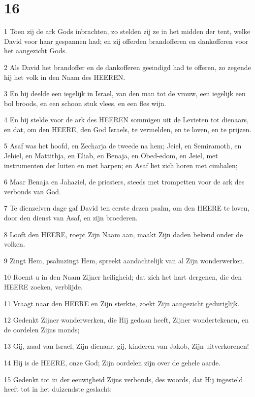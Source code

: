 \chapter{16}

\par 1 Toen zij de ark Gods inbrachten, zo stelden zij ze in het midden der tent, welke David voor haar gespannen had; en zij offerden brandofferen en dankofferen voor het aangezicht Gods.
\par 2 Als David het brandoffer en de dankofferen geeindigd had te offeren, zo zegende hij het volk in den Naam des HEEREN.
\par 3 En hij deelde een iegelijk in Israel, van den man tot de vrouw, een iegelijk een bol broods, en een schoon stuk vlees, en een fles wijn.
\par 4 En hij stelde voor de ark des HEEREN sommigen uit de Levieten tot dienaars, en dat, om den HEERE, den God Israels, te vermelden, en te loven, en te prijzen.
\par 5 Asaf was het hoofd, en Zecharja de tweede na hem; Jeiel, en Semiramoth, en Jehiel, en Mattithja, en Eliab, en Benaja, en Obed-edom, en Jeiel, met instrumenten der luiten en met harpen; en Asaf liet zich horen met cimbalen;
\par 6 Maar Benaja en Jahaziel, de priesters, steeds met trompetten voor de ark des verbonds van God.
\par 7 Te dienzelven dage gaf David ten eerste dezen psalm, om den HEERE te loven, door den dienst van Asaf, en zijn broederen.
\par 8 Looft den HEERE, roept Zijn Naam aan, maakt Zijn daden bekend onder de volken.
\par 9 Zingt Hem, psalmzingt Hem, spreekt aandachtelijk van al Zijn wonderwerken.
\par 10 Roemt u in den Naam Zijner heiligheid; dat zich het hart dergenen, die den HEERE zoeken, verblijde.
\par 11 Vraagt naar den HEERE en Zijn sterkte, zoekt Zijn aangezicht geduriglijk.
\par 12 Gedenkt Zijner wonderwerken, die Hij gedaan heeft, Zijner wondertekenen, en de oordelen Zijns monds;
\par 13 Gij, zaad van Israel, Zijn dienaar, gij, kinderen van Jakob, Zijn uitverkorenen!
\par 14 Hij is de HEERE, onze God; Zijn oordelen zijn over de gehele aarde.
\par 15 Gedenkt tot in der eeuwigheid Zijns verbonds, des woords, dat Hij ingesteld heeft tot in het duizendste geslacht;
